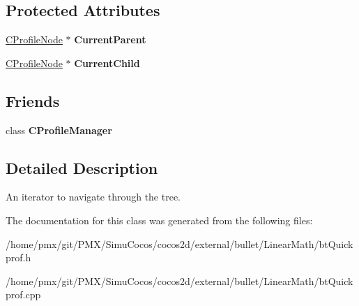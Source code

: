\subsection*{Protected Attributes}
\begin{DoxyCompactItemize}
\item 
\mbox{\label{classCProfileIterator_af146bd43d0e4803152ae53e0d2cc7b24}} 
\hyperlink{classCProfileNode}{C\+Profile\+Node} $\ast$ {\bfseries Current\+Parent}
\item 
\mbox{\label{classCProfileIterator_a5a00c4008c146993e056383582293366}} 
\hyperlink{classCProfileNode}{C\+Profile\+Node} $\ast$ {\bfseries Current\+Child}
\end{DoxyCompactItemize}
\subsection*{Friends}
\begin{DoxyCompactItemize}
\item 
\mbox{\label{classCProfileIterator_a1458d507c444090eecf484fcb2a000a8}} 
class {\bfseries C\+Profile\+Manager}
\end{DoxyCompactItemize}


\subsection{Detailed Description}
An iterator to navigate through the tree. 

The documentation for this class was generated from the following files\+:\begin{DoxyCompactItemize}
\item 
/home/pmx/git/\+P\+M\+X/\+Simu\+Cocos/cocos2d/external/bullet/\+Linear\+Math/bt\+Quickprof.\+h\item 
/home/pmx/git/\+P\+M\+X/\+Simu\+Cocos/cocos2d/external/bullet/\+Linear\+Math/bt\+Quickprof.\+cpp\end{DoxyCompactItemize}
